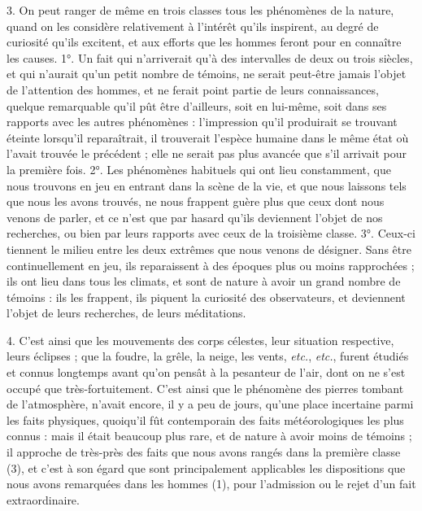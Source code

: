\documentclass[a4paper, 11pt, oneside, polutonikogreek, french]{article}
\begin{document}
3. On peut ranger de même en trois classes tous les phénomènes de la nature, quand on les considère relativement à l'intérêt qu'ils inspirent, au degré de curiosité qu'ils excitent, et aux efforts que les hommes feront pour en connaître les causes. 1°. Un fait qui n'arriverait qu'à des intervalles de deux ou trois siècles, et qui n'aurait qu'un petit nombre de témoins, ne serait peut-être jamais l'objet de l'attention des hommes, et ne ferait point partie de leurs connaissances, quelque remarquable qu'il pût être d'ailleurs, soit en lui-même, soit dans ses rapports avec les autres phénomènes : l'impression qu'il produirait se trouvant éteinte lorsqu'il reparaîtrait, il trouverait l'espèce humaine dans le même état où l'avait trouvée le précédent ; elle ne serait pas plus avancée que s'il arrivait pour la première fois. 2°. Les phénomènes habituels qui ont lieu constamment, que nous trouvons en jeu en entrant dans la scène de la vie, et que nous laissons tels que nous les avons trouvés, ne nous frappent guère plus que ceux dont nous venons de parler, et ce n'est que par hasard qu'ils deviennent l'objet de nos recherches, ou bien par leurs rapports avec ceux de la troisième classe. 3°. Ceux-ci tiennent le milieu entre les deux extrêmes que nous venons de désigner. Sans être continuellement en jeu, ils reparaissent à des époques plus ou moins rapprochées ; ils ont lieu dans tous les climats, et sont de nature à avoir un grand nombre de témoins : ils les frappent, ils piquent la curiosité des observateurs, et deviennent l'objet de leurs recherches, de leurs méditations.

4. C'est ainsi que les mouvements des corps célestes, leur situation respective, leurs éclipses ; que la foudre, la grêle, la neige, les vents, \emph{etc.}, \emph{etc.}, furent étudiés et connus longtemps avant qu'on pensât à la pesanteur de l'air, dont on ne s'est occupé que très-fortuitement. C'est ainsi que le phénomène des pierres tombant de l'atmosphère, n'avait encore, il y a peu de jours, qu'une place incertaine parmi les faits physiques, quoiqu'il fût contemporain des faits météorologiques les plus connus : mais il était beaucoup plus rare, et de nature à avoir moins de témoins ; il approche de très-près des faits que nous avons rangés dans la première classe (3), et c'est à son égard que sont principalement applicables les dispositions que nous avons remarquées dans les hommes (1), pour l'admission ou le rejet d'un fait extraordinaire.
\end{document}
